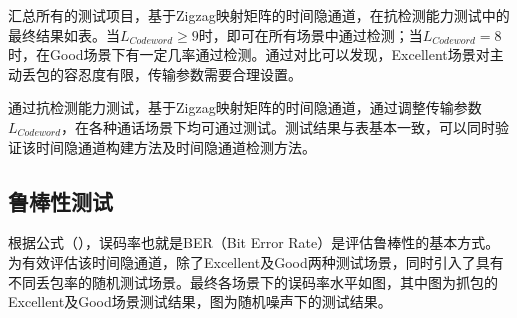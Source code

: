 汇总所有的测试项目，基于Zigzag映射矩阵的时间隐通道，在抗检测能力测试中的最终结果如表。当$L_{Codeword}\ge 9$时，即可在所有场景中通过检测；当$L_{Codeword} = 8$时，在Good场景下有一定几率通过检测。通过对比可以发现，Excellent场景对主动丢包的容忍度有限，传输参数需要合理设置。

通过抗检测能力测试，基于Zigzag映射矩阵的时间隐通道，通过调整传输参数$L_{Codeword}$，在各种通话场景下均可通过测试。测试结果与表基本一致，可以同时验证该时间隐通道构建方法及时间隐通道检测方法。

\subsection{鲁棒性测试}
\label{chap:zigzag:results:robustness}


根据公式（），误码率也就是BER（Bit Error Rate）是评估鲁棒性的基本方式。为有效评估该时间隐通道，除了Excellent及Good两种测试场景，同时引入了具有不同丢包率的随机测试场景。最终各场景下的误码率水平如图，其中图为抓包的Excellent及Good场景测试结果，图为随机噪声下的测试结果。

